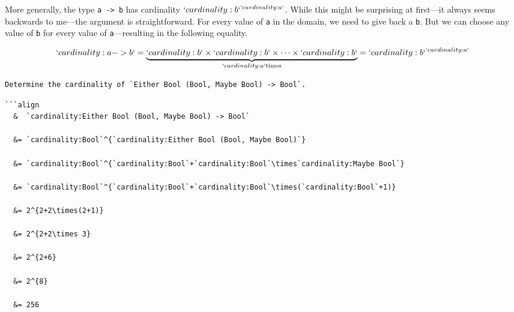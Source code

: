 \documentclass[
  11pt,
]{book}
\theoremstyle{nonumberplain}
\begin{document}
More generally, the type \texttt{a\ -\textgreater{}\ b} has cardinality
\(`cardinality:b`^{`cardinality:a`}\). While this might be surprising at
first---it always seems backwards to me---the argument is
straightforward. For every value of \texttt{a} in the domain, we need to
give back a \texttt{b}. But we can choose any value of \texttt{b} for
every value of \texttt{a}---resulting in the following equality.

\[
`cardinality:a -> b` = \underbrace{`cardinality:b` \times `cardinality:b` \times \cdots \times
`cardinality:b`}_{`cardinality:a` \text{times}} = `cardinality:b`^{`cardinality:a`}
\]

\begin{verbatim}
Determine the cardinality of `Either Bool (Bool, Maybe Bool) -> Bool`.
\end{verbatim}

\begin{verbatim}
```align
  &  `cardinality:Either Bool (Bool, Maybe Bool) -> Bool`

  &= `cardinality:Bool`^{`cardinality:Either Bool (Bool, Maybe Bool)`}

  &= `cardinality:Bool`^{`cardinality:Bool`+`cardinality:Bool`\times`cardinality:Maybe Bool`}

  &= `cardinality:Bool`^{`cardinality:Bool`+`cardinality:Bool`\times(`cardinality:Bool`+1)}

  &= 2^{2+2\times(2+1)}

  &= 2^{2+2\times 3}

  &= 2^{2+6}

  &= 2^{8}

  &= 256
\end{verbatim}
\end{document}
